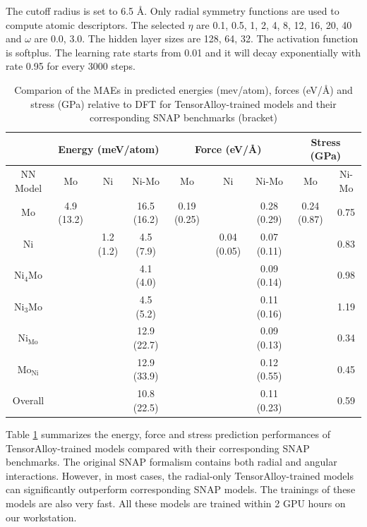 \documentclass[preprint]{revtex4-2}
\begin{document}
The cutoff radius is set to 6.5 \AA. Only radial symmetry 
functions are used to compute atomic descriptors. The selected $\eta$ are 
0.1, 0.5, 1, 2, 4, 8, 12, 16, 20, 40 and $\omega$ are 0.0, 3.0. The hidden layer
sizes are 128, 64, 32. The activation function is softplus.
The learning rate starts from 0.01 and it will decay exponentially with rate 
0.95 for every 3000 steps.

% 
%
\begin{table}[h]
\centering
\begin{tabular}{cccc|ccc|cc}
\hline
 & \multicolumn{3}{c|}{Energy (meV/atom)} & \multicolumn{3}{c|}{Force (eV/\AA)}
 & \multicolumn{2}{c}{Stress (GPa)} \\
\hline
NN Model & Mo & Ni & Ni-Mo & Mo & Ni & Ni-Mo & Mo & Ni-Mo \\
\hline
Mo & 4.9 (13.2) & & 16.5 (16.2) & 0.19 (0.25) & & 0.28 (0.29) & 0.24 (0.87) 
   & 0.75 \\
Ni & & 1.2 (1.2) & 4.5 (7.9) & & 0.04 (0.05) & 0.07 (0.11) & & 0.83 \\
Ni$_4$Mo & & & 4.1 (4.0) & & & 0.09 (0.14) & & 0.98 \\ 
Ni$_3$Mo & & & 4.5 (5.2) & & & 0.11 (0.16) & & 1.19 \\
Ni$_{\mathrm{Mo}}$ & & & 12.9 (22.7) & & & 0.09 (0.13) & & 0.34 \\
Mo$_{\mathrm{Ni}}$ & & & 12.9 (33.9) & & & 0.12 (0.55) & & 0.45 \\
Overall & & & 10.8 (22.5) & & & 0.11 (0.23) & & 0.59 \\
\hline
\end{tabular}

\caption{\label{table:MAE}
Comparion of the MAEs in predicted energies (mev/atom), forces (eV/\AA) and 
stress (GPa) relative to DFT for TensorAlloy-trained models and their
corresponding SNAP benchmarks (bracket)}
\end{table}

Table \ref{table:MAE} summarizes the energy, force and stress prediction 
performances of TensorAlloy-trained models compared with their corresponding 
SNAP benchmarks. The original SNAP formalism contains both radial and angular 
interactions. However, in most cases, the radial-only TensorAlloy-trained 
models can significantly outperform corresponding SNAP models. The trainings of 
these models are also very fast. All these models are trained within 2 GPU hours
on our workstation. 
\end{document}
